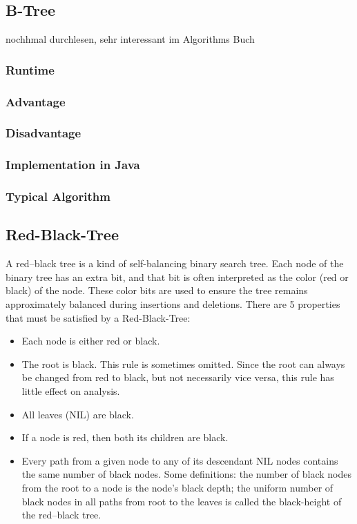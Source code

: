 \documentclass[12pt,a4paper]{article}
\newcommand{\RuntimeHead}{Runtime}
\newcommand{\AdvantageHead}{Advantage}
\newcommand{\DisadvantageHead}{Disadvantage}
\newcommand{\ImplementationInJavaHead}{Implementation in Java}
\newcommand{\TypicalAlgorithmHead}{Typical Algorithm}
\begin{document}
\subsection{B-Tree}
nochhmal durchlesen, sehr interessant im Algorithms Buch
\subsubsection{\RuntimeHead}
\subsubsection{\AdvantageHead}
\subsubsection{\DisadvantageHead}
\subsubsection{\ImplementationInJavaHead}
\subsubsection{\TypicalAlgorithmHead}

\subsection{Red-Black-Tree}
A red–black tree is a kind of self-balancing binary search tree. Each node of the binary tree has an extra bit, and that bit is often interpreted as the color (red or black) of the node. These color bits are used to ensure the tree remains approximately balanced during insertions and deletions. There are 5 properties that must be satisfied by a Red-Black-Tree:\\

\begin{itemize}
\item Each node is either red or black.
\item The root is black. This rule is sometimes omitted. Since the root can always be changed from red to black, but not necessarily vice versa, this rule has little effect on analysis.
\item All leaves (NIL) are black.
\item If a node is red, then both its children are black.
\item Every path from a given node to any of its descendant NIL nodes contains the same number of black nodes. Some definitions: the number of black nodes from the root to a node is the node's black depth; the uniform number of black nodes in all paths from root to the leaves is called the black-height of the red–black tree.
\end{itemize}
\end{document}
